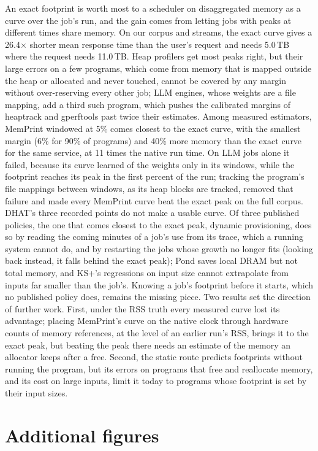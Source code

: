\documentclass[11pt]{article}
\newcommand{\memprint}{MemPrint}
\begin{document}
An exact footprint is worth most to a scheduler on disaggregated memory as a curve over the job's run, and
the gain comes from letting jobs with peaks at different times share memory. On our corpus and streams, the
exact curve gives a 26.4$\times$ shorter mean response time than the user's request and needs 5.0\,TB where the
request needs 11.0\,TB. Heap profilers get most peaks right, but their large errors on a few programs, which
come from memory that is mapped outside the heap or allocated and never touched, cannot be covered by any margin
without over-reserving every other job; LLM engines, whose weights are a file mapping, add a third such program,
which pushes the calibrated margins of heaptrack and gperftools past twice their estimates. Among measured
estimators, \memprint{} windowed at 5\% comes closest to the exact curve, with the smallest margin (6\% for 90\% of
programs) and 40\% more memory than the exact curve for the same service, at 11 times the native run time. On LLM
jobs alone it failed, because its curve learned of the weights only in its windows, while the footprint reaches
its peak in the first percent of the run; tracking the program's file mappings between windows, as its heap blocks
are tracked, removed that failure and made every \memprint{} curve beat the exact peak on the full corpus. DHAT's three recorded points do not make a
usable curve. Of three published policies, the one that comes
closest to the exact peak, dynamic provisioning, does so by reading the coming minutes of a job's use from its
trace, which a running system cannot do, and by restarting the jobs whose growth no longer fits (looking back
instead, it falls behind the exact peak); Pond saves local
DRAM but not total memory, and KS+'s regressions on input size cannot extrapolate from inputs far smaller than
the job's. Knowing a job's footprint before it starts, which no published policy does, remains the missing piece. Two results set the direction of further work. First, under the RSS truth every measured curve
lost its advantage; placing \memprint{}'s curve on the native clock through hardware counts of memory references,
at the level of an earlier run's RSS, brings it to the exact peak, but beating the peak there needs an estimate of
the memory an allocator keeps after a free. Second, the static route predicts footprints
without running the program, but its errors on programs that free and reallocate memory, and its cost on large
inputs, limit it today to programs whose footprint is set by their input sizes.

\appendix
\section{Additional figures}
\end{document}
